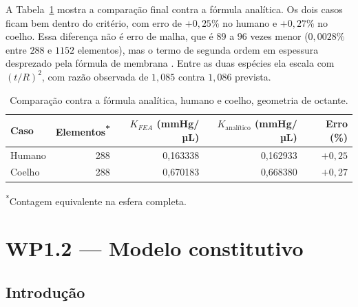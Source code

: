 A Tabela~\ref{tab:wp1_sensibilidade} mostra a comparação final contra a fórmula analítica. Os dois casos ficam bem dentro do critério, com erro de $+0{,}25\%$ no humano e $+0{,}27\%$ no coelho. Essa diferença não é erro de malha, que é $89$ a $96$ vezes menor ($0{,}0028\%$ entre $288$ e $1152$ elementos), mas o termo de segunda ordem em espessura desprezado pela fórmula de membrana \citep{timoshenko1959}. Entre as duas espécies ela escala com $(t/R)^2$, com razão observada de $1{,}085$ contra $1{,}086$ prevista.
 
\begin{table}[h]
\centering
\caption{Comparação contra a fórmula analítica, humano e coelho, geometria de octante.}
\label{tab:wp1_sensibilidade}
\begin{tabular}{@{}lrrrr@{}}
\toprule
Caso & Elementos\textsuperscript{*} & $K_{FEA}$ (mmHg/µL) & $K_{\text{analítico}}$ (mmHg/µL) & Erro (\%) \\
\midrule
Humano & 288 & 0,163338 & 0,162933 & $+0{,}25$ \\
Coelho & 288 & 0,670183 & 0,668380 & $+0{,}27$ \\
\bottomrule
\end{tabular}
 
\vspace{2pt}
\footnotesize\textsuperscript{*}Contagem equivalente na esfera completa.
\end{table}
 

 
\section{WP1.2 --- Modelo constitutivo}
 
\subsection{Introdução}
 
